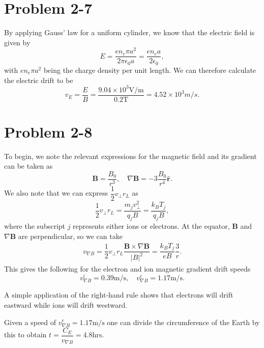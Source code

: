 \section*{Problem 2-7}
\label{sec:2-7}
By applying Gauss' law for a uniform cylinder, we know that the electric field is given by
\begin{equation}
	E = \dfrac{en_e\pi a^2}{2\pi \epsilon_0 a} = \dfrac{en_e a}{2 \epsilon_0},
\end{equation}
with \(en_e\pi a^2\) being the charge density per unit length. We can therefore calculate the electric drift to be
\begin{equation}
	v_E = \dfrac{E}{B} = \dfrac{9.04 \times 10^3 \text{V/m}}{0.2\text{T}} = 4.52 \times 10^3 m/s.
\end{equation}

\section*{Problem 2-8}
\label{sec:2-8}
To begin, we note the relevant expressions for the magnetic field and its gradient can be taken as
\begin{equation}
	\textbf{B} = \dfrac{B_0}{r^3}, \quad \nabla\textbf{B} = -3\dfrac{B_0}{r^4}\hat{\textbf{r}}.
\end{equation}
We also note that we can express \(\dfrac{1}{2} v_\perp r_L \) as
\begin{equation}
\dfrac{1}{2} v_\perp r_L = \dfrac{m_jv_\perp^2}{q_jB} = \dfrac{k_BT_j}{q_jB},
\end{equation}
where the subscript \(j\) represents either ions or electrons. At the equator, \(\textbf{B}\) and \(\nabla\textbf{B} \) are perpendicular, so we can take
\begin{align}
	v_{\nabla B} = \dfrac{1}{2} v_\perp r_L \dfrac{\textbf{B} \times \nabla \textbf{B}}{|B|^2} = \dfrac{k_BT_j}{eB}\dfrac{3}{r}.
\end{align}
This gives the following for the electron and ion magnetic gradient drift speeds
\begin{equation}
	v_{\nabla B}^i = 0.39\text{m/s}, \quad v_{\nabla B}^e = 1.17\text{m/s}.
\end{equation}

A simple application of the right-hand rule shows that electrons will drift eastward while ions will drift westward. 

Given a speed of \(v_{\nabla B}^e = 1.17\text{m/s} \) one can divide the circumference of the Earth by this to obtain \(t = \dfrac{C_E}{v_{\nabla B}} = 4.8\text{hrs}\).

